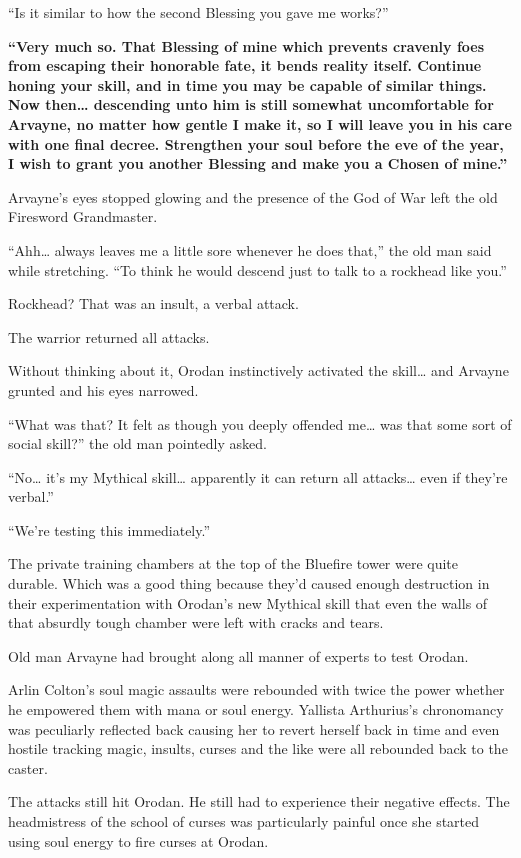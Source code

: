 \documentclass[a4paper,10pt]{book}
\begin{document}
“Is it similar to how the second Blessing you gave me works?”\par
\textbf{“Very much so. That Blessing of mine which prevents cravenly foes from escaping their honorable fate, it bends reality itself. Continue honing your skill, and in time you may be capable of similar things. Now then… descending unto him is still somewhat uncomfortable for Arvayne, no matter how gentle I make it, so I will leave you in his care with one final decree. Strengthen your soul before the eve of the year, I wish to grant you another Blessing and make you a Chosen of mine.”}\par
Arvayne’s eyes stopped glowing and the presence of the God of War left the old Firesword Grandmaster.\par
“Ahh… always leaves me a little sore whenever he does that,” the old man said while stretching. “To think he would descend just to talk to a rockhead like you.”\par
Rockhead? That was an insult, a verbal attack.\par
The warrior returned all attacks.\par
Without thinking about it, Orodan instinctively activated the skill… and Arvayne grunted and his eyes narrowed.\par
“What was that? It felt as though you deeply offended me… was that some sort of social skill?” the old man pointedly asked.\par
“No… it’s my Mythical skill… apparently it can return all attacks… even if they’re verbal.”\par
“We’re testing this immediately.”\par
\par
The private training chambers at the top of the Bluefire tower were quite durable. Which was a good thing because they’d caused enough destruction in their experimentation with Orodan’s new Mythical skill that even the walls of that absurdly tough chamber were left with cracks and tears.\par
Old man Arvayne had brought along all manner of experts to test Orodan.\par
Arlin Colton’s soul magic assaults were rebounded with twice the power whether he empowered them with mana or soul energy. Yallista Arthurius’s chronomancy was peculiarly reflected back causing her to revert herself back in time and even hostile tracking magic, insults, curses and the like were all rebounded back to the caster.\par
The attacks still hit Orodan. He still had to experience their negative effects. The headmistress of the school of curses was particularly painful once she started using soul energy to fire curses at Orodan.\par
\end{document}
